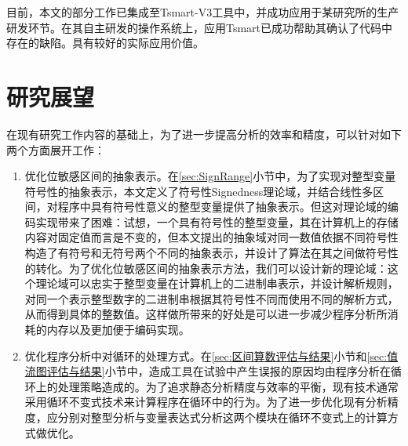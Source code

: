 目前，本文的部分工作已集成至Tsmart-V3工具中，并成功应用于某研究所的生产研发环节。在其自主研发的操作系统上，应用Tsmart已成功帮助其确认了代码中存在的缺陷。具有较好的实际应用价值。

\section{研究展望}

在现有研究工作内容的基础上，为了进一步提高分析的效率和精度，可以针对如下两个方面展开工作：

\begin{enumerate}
	\item 优化位敏感区间的抽象表示。在\ref{sec:SignRange}小节中，为了实现对整型变量符号性的抽象表示，本文定义了符号性Signedness理论域，并结合线性多区间，对程序中具有符号性意义的整型变量提供了抽象表示。但这对理论域的编码实现带来了困难：试想，一个具有符号性的整型变量，其在计算机上的存储内容对固定值而言是不变的，但本文提出的抽象域对同一数值依据不同符号性构造了有符号和无符号两个不同的抽象表示，并设计了算法在其之间做符号性的转化。为了优化位敏感区间的抽象表示方法，我们可以设计新的理论域：这个理论域可以忠实于整型变量在计算机上的二进制串表示，并设计解析规则，对同一个表示整型数字的二进制串根据其符号性不同而使用不同的解析方式，从而得到具体的整数值。这样做所带来的好处是可以进一步减少程序分析所消耗的内存以及更加便于编码实现。
	
	\item 优化程序分析中对循环的处理方式。在\ref{sec:区间算数评估与结果}小节和\ref{sec:值流图评估与结果}小节中，造成工具在试验中产生误报的原因均由程序分析在循环上的处理策略造成的。为了追求静态分析精度与效率的平衡，现有技术通常采用循环不变式技术来计算程序在循环中的行为。为了进一步优化现有分析精度，应分别对整型分析与变量表达式分析这两个模块在循环不变式上的计算方式做优化。
\end{enumerate}



